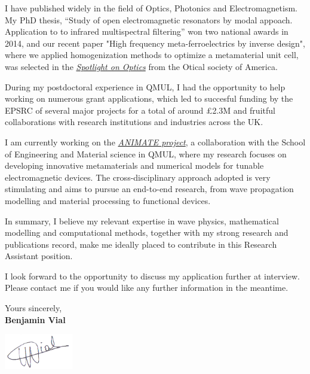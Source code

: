 \documentclass{cv}
\begin{document}
I have published widely in the field of Optics, Photonics
and Electromagnetism.
My PhD thesis, “Study of open electromagnetic resonators by modal appoach. 
Application to to infrared multispectral filtering” won two national awards in 2014, and
our recent paper "High frequency meta-ferroelectrics by inverse design", where we applied 
homogenization methods to optimize a metamaterial unit cell, was selected
in the \textit{\href{https://www.osapublishing.org/spotlight/summary.cfm?id=450295}{Spotlight on Optics}}
from the Otical society of America.


During my postdoctoral experience in QMUL, I had the
opportunity to help working on numerous grant applications, which led to succesful funding by the EPSRC of several major projects
for a total of around £2.3M and fruitful collaborations with research institutions
and industries across the UK.

I am currently working on the \textit{\href{https://animate-research.com/}{ANIMATE project}},
a collaboration with the School of Engineering and Material science in QMUL,
where my research focuses on developing innovative metamaterials and
numerical models for tunable electromagnetic devices.
The cross-disciplinary approach adopted is very stimulating and aims to
pursue an end-to-end research, from wave propagation modelling and material processing to
functional devices. 

In summary, I believe my relevant expertise in wave physics, mathematical modelling and 
computational methods, together with my strong research and publications record, make me ideally placed to contribute in this 
Research Assistant position.

I look forward to the opportunity to discuss my application further at
interview. Please contact me if you would like any further information
in the meantime.



Yours sincerely,\\[1.5em]


\textbf{Benjamin Vial}

\includegraphics[width=3cm]{sig.png}
%

\newpage




\end{document}
